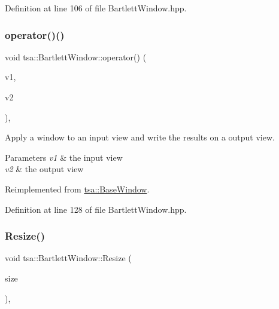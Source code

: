 Definition at line 106 of file Bartlett\+Window.\+hpp.

\mbox{\label{classtsa_1_1_bartlett_window_a44d722552ca5281e28a28eadbed2099e}} 
\subsubsection{\texorpdfstring{operator()()}{operator()()}\hspace{0.1cm}{\footnotesize\ttfamily [2/2]}}
{\footnotesize\ttfamily void tsa\+::\+Bartlett\+Window\+::operator() (\begin{DoxyParamCaption}\item[{\hyperlink{namespacetsa_ac599574bcc094eda25613724b8f3ca9e}{Seq\+View\+Double} \&}]{v1,  }\item[{\hyperlink{namespacetsa_ac599574bcc094eda25613724b8f3ca9e}{Seq\+View\+Double} \&}]{v2 }\end{DoxyParamCaption})\hspace{0.3cm}{\ttfamily [inline]}, {\ttfamily [virtual]}}

Apply a window to an input view and write the results on a output view.


\begin{DoxyParams}{Parameters}
{\em v1} & the input view \\
\hline
{\em v2} & the output view \\
\hline
\end{DoxyParams}


Reimplemented from \hyperlink{classtsa_1_1_base_window_afda50daa943527e09792b06e5ba69bcb}{tsa\+::\+Base\+Window}.



Definition at line 128 of file Bartlett\+Window.\+hpp.

\mbox{\label{classtsa_1_1_bartlett_window_af63f6fdd7e2a10d77db1c7363e9963f5}} 
\subsubsection{\texorpdfstring{Resize()}{Resize()}}
{\footnotesize\ttfamily void tsa\+::\+Bartlett\+Window\+::\+Resize (\begin{DoxyParamCaption}\item[{unsigned int}]{size }\end{DoxyParamCaption})\hspace{0.3cm}{\ttfamily [inline]}, {\ttfamily [virtual]}}

